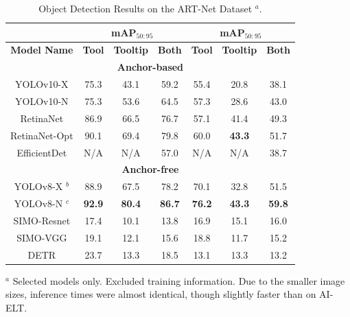 \footnotesize
\begin{table}[htbp]
\centering
\caption{Object Detection Results on the ART-Net Dataset $^a$.}
\vspace*{-3mm}
\label{fig:artresults}
\begin{tabular}{|c|c|c|c|c|c|c|}
\hline
\multicolumn{1}{|c|}{} & \multicolumn{3}{c|}{\textbf{mAP$_{50:95}$}} & \multicolumn{3}{c|}{\textbf{mAP$_{50:95}$}} \\
\hline
\textbf{Model Name} & \textbf{Tool} & \textbf{Tooltip} & \textbf{Both} & \textbf{Tool} & \textbf{Tooltip} & \textbf{Both} \\ 
\hline
\multicolumn{7}{|c|}{\textbf{Anchor-based}} \\
\hline
YOLOv10-X & 75.3 & 43.1 & 59.2 & 55.4 & 20.8 & 38.1 \\
YOLOv10-N & 75.3 & 53.6 & 64.5 & 57.3 & 28.6 & 43.0 \\
RetinaNet & 86.9 & 66.5 & 76.7 & 57.1 & 41.4 & 49.3 \\
RetinaNet-Opt & 90.1 & 69.4 & 79.8 & 60.0 & \textbf{43.3} & 51.7 \\
EfficientDet & N/A & N/A & 57.0 & N/A & N/A & 38.7 \\
\hline
\multicolumn{7}{|c|}{\textbf{Anchor-free}} \\
\hline
\rowcolor{pink} YOLOv8-X $^b$ & 88.9 & 67.5 & 78.2 & 70.1 & 32.8 & 51.5 \\
\rowcolor{yellow} YOLOv8-N $^c$ & \textbf{92.9} & \textbf{80.4} & \textbf{86.7} & \textbf{76.2} & \textbf{43.3} & \textbf{59.8} \\
SIMO-Resnet & 17.4 & 10.1 & 13.8 & 16.9 & 15.1 & 16.0 \\
SIMO-VGG & 19.1 & 12.1 & 15.6 & 18.8 & 11.7 & 15.2 \\
DETR & 23.7 & 13.3 & 18.5 & 13.1 & 13.3 & 13.2 \\
\hline
\end{tabular}
\newline
\scriptsize{$^a$ Selected models only. Excluded training information. Due to the smaller image sizes, inference times were almost identical, though slightly faster than on AI-ELT.}
\end{table}

